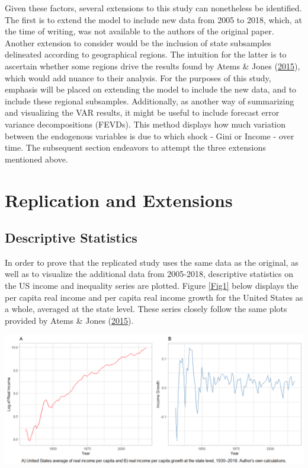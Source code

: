 \documentclass[11pt,preprint, authoryear]{elsarticle}
\let\origfigure\figure
\let\endorigfigure\endfigure
\renewenvironment{figure}[1][2] {
    \expandafter\origfigure\expandafter[H]
} {
    \endorigfigure
}
\numberwithin{equation}{section}
\numberwithin{figure}{section}
\numberwithin{table}{section}
\begin{document}
Given these factors, several extensions to this study can nonetheless be
identified. The first is to extend the model to include new data from
2005 to 2018, which, at the time of writing, was not available to the
authors of the original paper. Another extension to consider would be
the inclusion of state subsamples delineated according to geographical
regions. The intuition for the latter is to ascertain whether some
regions drive the results found by Atems \& Jones
(\protect\hyperlink{ref-atems}{2015}), which would add nuance to their
analysis. For the purposes of this study, emphasis will be placed on
extending the model to include the new data, and to include these
regional subsamples. Additionally, as another way of summarizing and
visualizing the VAR results, it might be useful to include forecast
error variance decompositions (FEVDs). This method displays how much
variation between the endogenous variables is due to which shock - Gini
or Income - over time. The subsequent section endeavors to attempt the
three extensions mentioned above.

\newpage

\hypertarget{replication-and-extensions}{%
\section{\texorpdfstring{Replication and Extensions
\label{Section 3}}{Replication and Extensions }}\label{replication-and-extensions}}

\hypertarget{descriptive-statistics}{%
\subsection{\texorpdfstring{Descriptive Statistics
\label{Section 3.1}}{Descriptive Statistics }}\label{descriptive-statistics}}

In order to prove that the replicated study uses the same data as the
original, as well as to visualize the additional data from 2005-2018,
descriptive statistics on the US income and inequality series are
plotted. Figure \ref{Fig1} below displays the per capita real income and
per capita real income growth for the United States as a whole, averaged
at the state level. These series closely follow the same plots provided
by Atems \& Jones (\protect\hyperlink{ref-atems}{2015}).

\begin{figure}[H]
\includegraphics[width=1\linewidth]{images/Fig1_US_Income_gridplot} \caption{\label{Fig1}}\label{fig:Fig1}
\end{figure}
\end{document}
